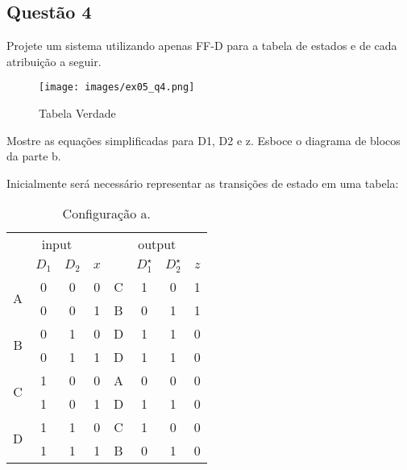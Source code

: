 \documentclass{article}
\begin{document}
\subsection{Questão 4}
    \begin{exercise}
        Projete um sistema utilizando apenas FF-D para a tabela de estados e de cada atribuição a seguir.
        \begin{figure}[H]
            \centering
            \texttt{[image: images/ex05\_q4.png]}
            \caption{Tabela Verdade}
        \end{figure}
        Mostre as equações simplificadas para D1, D2 e z. Esboce o diagrama de blocos da parte b.
    \end{exercise}
    \begin{resolution}
        Inicialmente será necessário representar as transições de estado em uma tabela:
        \begin{center}
            \begin{minipage}{0.45\linewidth}
            \begin{table}[H]
                \centering\begin{tabular}[]{c|ccc|c|ccc}
                    \multicolumn{4}{c|}{input}      & \multicolumn{4}{c}{output}\\
                                      &$D_1$&$D_2$&$x$ &   &$D_1^\star$&$D_2^\star$&$z$\\\hline
                    \multirow{2}{*}{A}& 0   & 0   &  0 & C & 1         & 0         &  1 \\
                                      & 0   & 0   &  1 & B & 0         & 1         &  1 \\
                    \multirow{2}{*}{B}& 0   & 1   &  0 & D & 1         & 1         &  0 \\
                                      & 0   & 1   &  1 & D & 1         & 1         &  0 \\
                    \multirow{2}{*}{C}& 1   & 0   &  0 & A & 0         & 0         &  0 \\
                                      & 1   & 0   &  1 & D & 1         & 1         &  0 \\
                    \multirow{2}{*}{D}& 1   & 1   &  0 & C & 1         & 0         &  0 \\
                                      & 1   & 1   &  1 & B & 0         & 1         &  0 \\\hline
                \end{tabular}\caption{Configuração a.}

\end{table}
\end{minipage}
\end{center}
\end{resolution}
\end{document}
